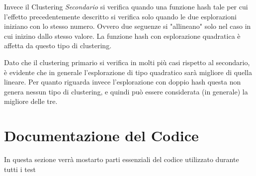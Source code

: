 \documentclass{article}
\begin{document}
Invece il Clustering \emph{Secondario} si verifica quando una funzione hash tale per cui l'effetto precedentemente descritto si verifica solo quando le due esplorazioni iniziano con lo stesso numero. Ovvero due seguenze si "allineano" solo nel caso in cui inizino dallo stesso valore. La funzione hash con esplorazione quadratica è affetta da questo tipo di clustering.

Dato che il clustering primario si verifica in molti più casi rispetto al secondario, è evidente che in generale l'esplorazione di tipo quadratico sarà migliore di quella lineare. Per quanto riguarda invece l'esplorazione con doppio hash questa non genera nessun tipo di clustering, e quindi può essere considerata (in generale) la migliore delle tre.

\section{Documentazione del Codice}
In questa sezione verrà mostarto parti essenziali del codice utilizzato durante tutti i test
\end{document}
